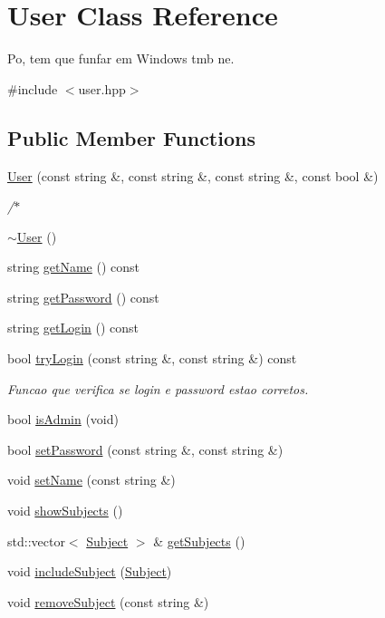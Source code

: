 \hypertarget{class_user}{}\section{User Class Reference}
\label{class_user}


Po, tem que funfar em Windows tmb ne.  




{\ttfamily \#include $<$user.\+hpp$>$}

\subsection*{Public Member Functions}
\begin{DoxyCompactItemize}
\item 
\hyperlink{class_user_a49a5d96676bc687582401a8feb6d8fab}{User} (const string \&, const string \&, const string \&, const bool \&)
\begin{DoxyCompactList}\small\item\em /$\ast$ \end{DoxyCompactList}\item 
\hyperlink{class_user_ac00b72ad64eb4149f7b21b9f5468c2b2}{$\sim$\+User} ()
\item 
string \hyperlink{class_user_ab9b2b5feb6bdd1582696eb6d44cee384}{get\+Name} () const
\item 
string \hyperlink{class_user_a33429bdd1253091697a9c5c5e1448bee}{get\+Password} () const
\item 
string \hyperlink{class_user_a696573ea58ab847ec562b3ff55f5532b}{get\+Login} () const
\item 
bool \hyperlink{class_user_af85eb63b7c9f95d82c1ccfc5b1f07761}{try\+Login} (const string \&, const string \&) const
\begin{DoxyCompactList}\small\item\em Funcao que verifica se login e password estao corretos. \end{DoxyCompactList}\item 
bool \hyperlink{class_user_ad459325546846a729a583db0a3c73f23}{is\+Admin} (void)
\item 
bool \hyperlink{class_user_ab31250ec7220ae7832cf20a13308457f}{set\+Password} (const string \&, const string \&)
\item 
void \hyperlink{class_user_a76273e1ada631144d57fc2173c9100aa}{set\+Name} (const string \&)
\item 
void \hyperlink{class_user_aa800167b7d7c5d342af15a0ba01a7ee4}{show\+Subjects} ()
\item 
std\+::vector$<$ \hyperlink{class_subject}{Subject} $>$ \& \hyperlink{class_user_ac31e6c1c46e39361b20be3e92b67085b}{get\+Subjects} ()
\item 
void \hyperlink{class_user_a4ecbfe6ef4b04825993217a889c64401}{include\+Subject} (\hyperlink{class_subject}{Subject})
\item 
void \hyperlink{class_user_a3b3ce064a0cc1edbca2c475ebcbd9e09}{remove\+Subject} (const string \&)
\end{DoxyCompactItemize}


